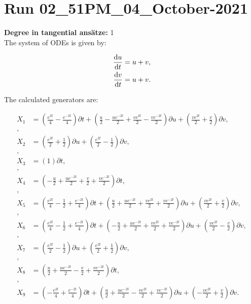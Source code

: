 \section*{Run 02\_51PM\_04\_October-2021}
\textbf{Degree in tangential ansätze:}	1\\
The system of ODEs is given by:

\begin{align*}
\dv{u}{t}&=u + v,\\
\dv{v}{t}&=u + v.\\
\end{align*}

\noindent The calculated generators are:

\begin{align*}
X_{1}&=\left( \frac{e^{2 t}}{4} - \frac{e^{- 2 t}}{4} \right)\partial t+\left( \frac{u}{2} - \frac{u e^{- 2 t}}{2} + \frac{v e^{2 t}}{2} - \frac{v e^{- 2 t}}{2} \right)\partial u+\left( \frac{v e^{2 t}}{2} + \frac{v}{2} \right)\partial v,\\
,\\
X_{2}&=\left( \frac{e^{2 t}}{2} + \frac{1}{2} \right)\partial u+\left( \frac{e^{2 t}}{2} - \frac{1}{2} \right)\partial v,\\
,\\
X_{3}&=\left( 1 \right)\partial t,\\
,\\
X_{4}&=\left( - \frac{u}{2} + \frac{u e^{- 2 t}}{2} + \frac{v}{2} + \frac{v e^{- 2 t}}{2} \right)\partial t,\\
,\\
X_{5}&=\left( \frac{e^{2 t}}{4} - \frac{1}{2} + \frac{e^{- 2 t}}{4} \right)\partial t+\left( \frac{u}{2} + \frac{u e^{- 2 t}}{2} + \frac{v e^{2 t}}{2} + \frac{v e^{- 2 t}}{2} \right)\partial u+\left( \frac{v e^{2 t}}{2} + \frac{v}{2} \right)\partial v,\\
,\\
X_{6}&=\left( \frac{e^{2 t}}{4} - \frac{1}{2} + \frac{e^{- 2 t}}{4} \right)\partial t+\left( - \frac{u}{2} + \frac{u e^{- 2 t}}{2} + \frac{v e^{2 t}}{2} + \frac{v e^{- 2 t}}{2} \right)\partial u+\left( \frac{v e^{2 t}}{2} - \frac{v}{2} \right)\partial v,\\
,\\
X_{7}&=\left( \frac{e^{2 t}}{2} - \frac{1}{2} \right)\partial u+\left( \frac{e^{2 t}}{2} + \frac{1}{2} \right)\partial v,\\
,\\
X_{8}&=\left( \frac{u}{2} + \frac{u e^{- 2 t}}{2} - \frac{v}{2} + \frac{v e^{- 2 t}}{2} \right)\partial t,\\
,\\
X_{9}&=\left( - \frac{e^{2 t}}{4} + \frac{e^{- 2 t}}{4} \right)\partial t+\left( \frac{u}{2} + \frac{u e^{- 2 t}}{2} - \frac{v e^{2 t}}{2} + \frac{v e^{- 2 t}}{2} \right)\partial u+\left( - \frac{v e^{2 t}}{2} + \frac{v}{2} \right)\partial v.\\
\end{align*}
